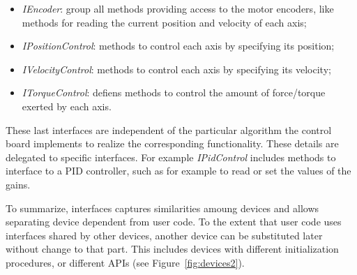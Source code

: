 \begin{itemize}

\item \emph{IEncoder}: group all methods providing access to the motor 
encoders, like methods for reading the current position and velocity of 
each axis;

\item \emph{IPositionControl}: methods to control each axis 
by specifying its position;

\item \emph{IVelocityControl}: methods to control each axis 
by specifying its velocity;

\item \emph{ITorqueControl}: defiens methods to control the amount of 
force/torque exerted by each axis.

\end{itemize}

These last interfaces are independent of the particular algorithm the 
control board implements to realize the corresponding functionality. 
These details are delegated to specific interfaces. For example 
\emph{IPidControl} includes methods to interface to a PID controller, 
such as for example to read or set the values of the gains.

To summarize, interfaces captures similarities amoung devices and 
allows separating device dependent from user code. To the 
extent that user code uses interfaces shared by other devices, 
another device can be substituted later without change to that part. This 
includes devices with different initialization procedures, or different
APIs (see Figure~\ref{fig:devices2}).

